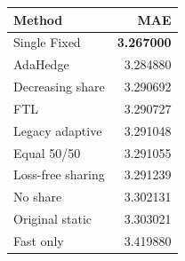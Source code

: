 \begin{tabular}{@{}lr@{}}\toprule
Method & MAE\\\midrule
Single Fixed & \textbf{3.267000}\\
AdaHedge & 3.284880\\
Decreasing share & 3.290692\\
FTL & 3.290727\\
Legacy adaptive & 3.291048\\
Equal 50/50 & 3.291055\\
Loss-free sharing & 3.291239\\
No share & 3.302131\\
Original static & 3.303021\\
Fast only & 3.419880\\
\bottomrule\end{tabular}
